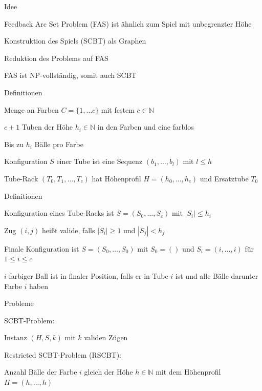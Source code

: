 \documentclass{beamer}
\begin{document}
\begin{frame}{Idee}
	\begin{pointlist}
		\item Feedback Arc Set Problem (FAS) ist ähnlich zum Spiel mit unbegrenzter Höhe
		\item Konstruktion des Spiels (SCBT) als Graphen 
		\item Reduktion des Problems auf FAS
		\item FAS ist NP-vollständig, somit auch SCBT
	\end{pointlist}
\end{frame}

\begin{frame}{Definitionen}
	\begin{pointlist}
		\item Menge an Farben $C=\{1,\dots c\}$ mit festem $c\in \mathbb{N}$
		\item $c+1$ Tuben der Höhe $h_i\in\mathbb{N}$ in den Farben und eine farblos
		\item Bis zu $h_i$ Bälle pro Farbe
		\item Konfiguration $S$ einer Tube ist eine Sequenz $(b_1,\dots,b_l)$ mit $l\leq h$
		\item Tube-Rack $(T_0, T_1,\dots,T_c)$ hat Höhenprofil $H=(h_0,\dots,h_c)$ und Ersatztube $T_0$
		\end{pointlist}
		\end{frame}
\begin{frame}{Definitionen}
	\begin{pointlist}
		\item Konfiguration eines Tube-Racks ist $S=(S_0,\dots,S_c)$ mit $|S_i| \leq h_i$
		\item Zug $(i,j)$ heißt valide, falls $|S_i|\geq 1$ und $|S_j| < h_j$
		\item Finale Konfiguration ist $S=(S_0,\dots, S_0)$ mit $S_0 = ()$ und $S_i =(i,\dots,i)$ für $1\leq i \leq c$
		\item $i$-farbiger Ball ist in finaler Position, falls er in Tube $i$ ist und alle Bälle darunter Farbe $i$ haben
	\end{pointlist}
\end{frame}

\begin{frame}{Probleme}
	\begin{pointlist}
		\item SCBT-Problem:
		\begin{arrowlist}
 			\item Instanz $(H,S,k)$ mit $k$ validen Zügen
		\end{arrowlist}
		\item Restricted SCBT-Problem (RSCBT):
		\begin{arrowlist}
 			\item Anzahl Bälle der Farbe $i$ gleich der Höhe $h\in\mathbb{N}$ mit dem Höhenprofil $H=(h,\dots,h)$
		\end{arrowlist}
	\end{pointlist}
\end{frame}
\end{document}
